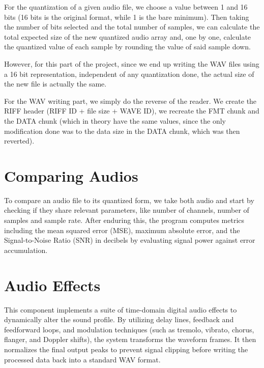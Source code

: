 For the quantization of a given audio file, we choose a value between 1 and 16 bits (16 bits is the original format, while 1 is the bare minimum). Then taking the number of bits selected and the total number of samples, we can calculate the total expected size of the new quantized audio array and, one by one, calculate the quantized value of each sample by rounding the value of said sample down.

However, for this part of the project, since we end up writing the WAV files using a 16 bit representation, independent of any quantization done, the actual size of the new file is actually the same.

For the WAV writing part, we simply do the reverse of the reader. We create the RIFF header (RIFF ID + file size + WAVE ID), we recreate the FMT chunk and the DATA chunk (which in theory have the same values, since the only modification done was to the data size in the DATA chunk, which was then reverted).

\vspace{10pt}
\section{Comparing Audios}

To compare an audio file to its quantized form, we take both audio and start by checking if they share relevant parameters, like number of channels, number of samples and sample rate. After enduring this, the program computes metrics including the mean squared error (MSE), maximum absolute error, and the Signal-to-Noise Ratio (SNR) in decibels by evaluating signal power against error accumulation.

\vspace{10pt}
\section{Audio Effects}

This component implements a suite of time-domain digital audio effects to dynamically alter the sound profile. By utilizing delay lines, feedback and feedforward loops, and modulation techniques (such as tremolo, vibrato, chorus, flanger, and Doppler shifts), the system transforms the waveform frames. It then normalizes the final output peaks to prevent signal clipping before writing the processed data back into a standard WAV format.

\endgroup